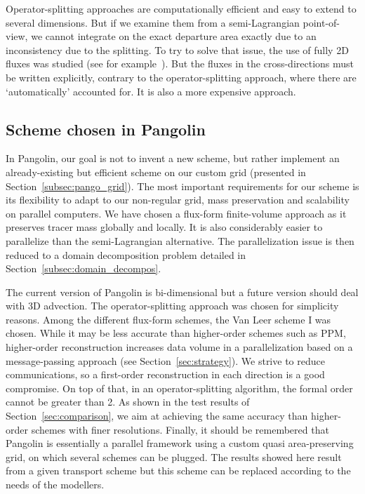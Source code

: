 Operator-splitting approaches are computationally efficient and easy to extend
to several dimensions. But if we examine them from a semi-Lagrangian
point-of-view, we cannot integrate on the exact departure area exactly due to an
inconsistency due to the splitting. To try to solve that issue, the use of fully
2D fluxes was studied (see for example~\cite{Rasch1994,Dukowicz2000}). But the
fluxes in the cross-directions must be written explicitly, contrary to the
operator-splitting approach, where there are `automatically' accounted for. It
is also a more expensive approach.

\subsection{Scheme chosen in Pangolin}
In Pangolin, our goal is not to invent a new scheme, but rather implement an
already-existing but efficient scheme on our custom grid (presented in
Section~\ref{subsec:pango_grid}). The most important requirements for our
scheme is its flexibility to adapt to our non-regular grid, mass preservation
and scalability on parallel computers. We have chosen a flux-form finite-volume
approach as it preserves tracer mass globally and locally. It is also
considerably easier to parallelize than the semi-Lagrangian alternative.  The
parallelization issue is then reduced to a domain decomposition problem detailed
in Section~\ref{subsec:domain_decompos}.

The current version of Pangolin is bi-dimensional but a future version should
deal with 3D advection. The operator-splitting approach was chosen for
simplicity reasons. Among the different flux-form schemes, the Van Leer scheme I
was chosen. While it may be less accurate than higher-order schemes such as
\gls{PPM}, higher-order reconstruction increases data volume in a
parallelization based on a message-passing approach (see
Section~\ref{sec:strategy}). We strive to reduce communications, so a first-order
reconstruction in each direction is a good compromise. On top of that, in an
operator-splitting algorithm, the formal order cannot be greater than 2.  As
shown in the test results of Section~\ref{sec:comparison}, we aim at
achieving the same accuracy than higher-order schemes with finer resolutions.
Finally, it should be remembered that Pangolin is essentially a parallel framework
using a custom quasi area-preserving grid, on which several schemes can be
plugged. The results showed here result from a given transport scheme but
this scheme can be replaced according to the needs of the modellers.

